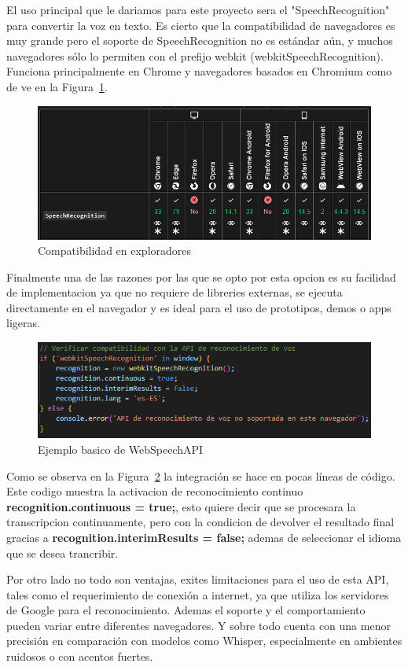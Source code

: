 \documentclass[a4paper, 12pt]{book}
\begin{document}
El uso principal que le dariamos para este proyecto sera el "SpeechRecognition" para convertir la voz en texto. Es cierto que la compatibilidad de navegadores es muy grande pero el soporte de SpeechRecognition no es estándar aún, y muchos navegadores sólo lo permiten con el prefijo webkit (webkitSpeechRecognition). Funciona principalmente en Chrome y navegadores basados en Chromium como de ve en la Figura~\ref{fig:SpeechRecognitionAPI}.
\begin{figure}[H]
    \centering
    \includegraphics[width=0.8\linewidth]{img/WebSpeechAPI.png}
    \caption{Compatibilidad en exploradores}
    \label{fig:SpeechRecognitionAPI}
\end{figure}

Finalmente una de las razones por las que se opto por esta opcion es su facilidad de implementacion ya que no requiere de libreries externas, se ejecuta directamente en el navegador y es ideal para el uso de prototipos, demos o apps ligeras.

\begin{figure}[H]
    \centering
    \includegraphics[width=0.8\linewidth]{img/WebKit.png}
    \caption{Ejemplo basico de WebSpeechAPI}
    \label{fig:WebKit}
\end{figure}

Como se observa en la Figura~\ref{fig:WebKit} la integración se hace en pocas líneas de código. Este codigo muestra la activacion de reconocimiento continuo \textbf{recognition.continuous = true;}, esto quiere decir que se procesara la transcripcion continuamente, pero con la condicion de devolver el resultado final gracias a \textbf{recognition.interimResults = false;} ademas de seleccionar el idioma que se desea trancribir.

Por otro lado no todo son ventajas, exites limitaciones para el uso de esta API, tales como el requerimiento de conexión a internet, ya que utiliza los servidores de Google para el reconocimiento. Ademas el soporte y el comportamiento pueden variar entre diferentes navegadores. Y sobre todo cuenta con una menor precisión en comparación con modelos como Whisper, especialmente en ambientes ruidosos o con acentos fuertes.
\end{document}
